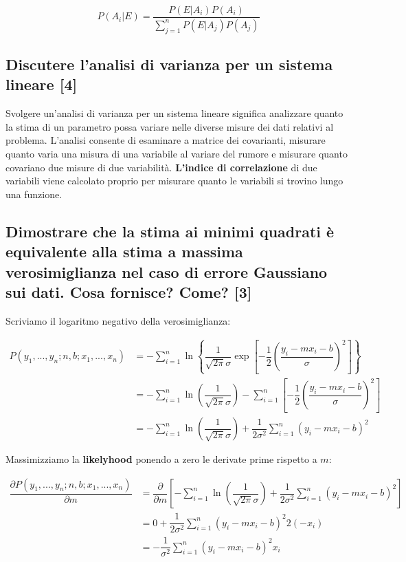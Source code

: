 \documentclass[\main/main.tex]{subfiles}
\begin{document}
\[
	P(A_i|E) = \dfrac{P(E|A_i)P(A_i)}{\sum_{j=1}^n P(E|A_j)P(A_j)}
\]

\subsection{Discutere l'analisi di varianza per un sistema lineare [4]}
Svolgere un'analisi di varianza per un sistema lineare significa analizzare quanto la stima di un parametro possa variare nelle diverse misure dei dati relativi al problema.
L'analisi consente di esaminare a matrice dei covarianti, misurare quanto varia una misura di una variabile al variare del rumore e misurare quanto covariano due misure di due variabilità.
\textbf{L'indice di correlazione} di due variabili viene calcolato proprio per misurare quanto le variabili si trovino lungo una funzione.

\subsection{Dimostrare che la stima ai minimi quadrati è equivalente alla stima a massima verosimiglianza nel caso di errore Gaussiano sui dati. Cosa fornisce? Come? [3]}
Scriviamo il logaritmo negativo della verosimiglianza:

\begin{align}
	P \left(y_1,...,y_n; n, b; x_1, ..., x_n \right) & =
	- \sum_{i=1}^n
	\ln \left\{
	\dfrac{1}{\sqrt{2\pi}\sigma}
	\exp \left[
		-\dfrac{1}{2}	\left(\dfrac{ y_i - mx_i - b}{\sigma} \right)^2
		\right]
	\right\}\\
	                                                 & =
	- \sum_{i=1}^n \ln
	\left ( \dfrac{1}{\sqrt{2\pi}\sigma} \right )
	- \sum_{i=1}^n
	\left[
		-\dfrac{1}{2}	\left(\dfrac{ y_i - mx_i - b}{\sigma} \right)^2
		\right]\\
	                                                 & =
	- \sum_{i=1}^n \ln
	\left ( \dfrac{1}{\sqrt{2\pi}\sigma} \right )
	+ \dfrac{1}{2\sigma^2} \sum_{i=1}^n
	\left(y_i - mx_i - b \right)^2
\end{align}

Massimizziamo la \textbf{likelyhood} ponendo a zero le derivate prime rispetto a $m$:

\begin{align}
	\dfrac{\partial P \left(y_1,...,y_n; n, b; x_1, ..., x_n \right)}{\partial m} & = \dfrac{\partial}{\partial m} \left [ - \sum_{i=1}^n \ln
		\left ( \dfrac{1}{\sqrt{2\pi}\sigma} \right )
		+ \dfrac{1}{2\sigma^2} \sum_{i=1}^n
		\left(y_i - mx_i - b \right)^2
		\right ]\\
	                                                                              & = 0 + \dfrac{1}{2\sigma^2} \sum_{i=1}^n \left(y_i - mx_i - b \right)^2 2 (-x_i) \\
	                                                                              & = -\dfrac{1}{\sigma^2} \sum_{i=1}^n \left(y_i - mx_i - b \right)^2  x_i
\end{align}
\end{document}
